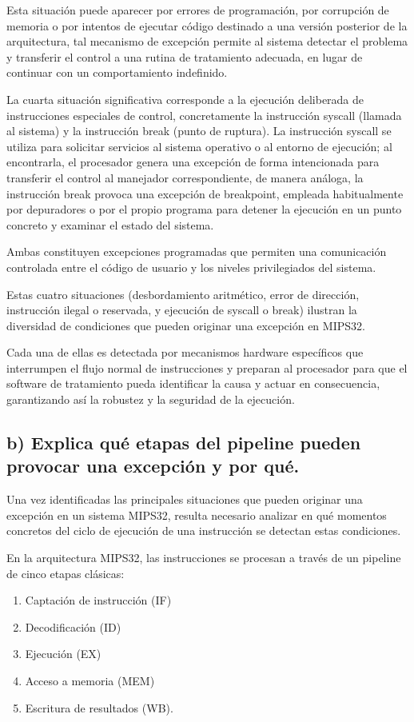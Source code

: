 \documentclass[12pt, letterpaper]{article}
\begin{document}
 Esta situación puede aparecer por errores de programación, por corrupción de memoria o por intentos de ejecutar código destinado a una versión posterior de la arquitectura, tal mecanismo de excepción permite al sistema detectar el problema y transferir el control a una rutina de tratamiento adecuada, en lugar de continuar con un comportamiento indefinido.

 La cuarta situación significativa corresponde a la ejecución deliberada de instrucciones especiales de control, concretamente la instrucción syscall (llamada al sistema) y la instrucción break (punto de ruptura). La instrucción syscall se utiliza para solicitar servicios al sistema operativo o al entorno de ejecución; al encontrarla, el procesador genera una excepción de forma intencionada para transferir el control al manejador correspondiente, de manera análoga, la instrucción break provoca una excepción de breakpoint, empleada habitualmente por depuradores o por el propio programa para detener la ejecución en un punto concreto y examinar el estado del sistema.

 Ambas constituyen excepciones programadas que permiten una comunicación controlada entre el código de usuario y los niveles privilegiados del sistema.

 Estas cuatro situaciones (desbordamiento aritmético, error de dirección, instrucción ilegal o reservada, y ejecución de syscall o break) ilustran la diversidad de condiciones que pueden originar una excepción en MIPS32. 

 Cada una de ellas es detectada por mecanismos hardware específicos que interrumpen el flujo normal de instrucciones y preparan al procesador para que el software de tratamiento pueda identificar la causa y actuar en consecuencia, garantizando así la robustez y la seguridad de la ejecución.
 \subsection*{b) Explica qué etapas del pipeline pueden provocar una excepción y por qué. }

 Una vez identificadas las principales situaciones que pueden originar una excepción en un sistema MIPS32, resulta necesario analizar en qué momentos concretos del ciclo de ejecución de una instrucción se detectan estas condiciones. 

 En la arquitectura MIPS32, las instrucciones se procesan a través de un pipeline de cinco etapas clásicas: 

\begin{enumerate}
    \item Captación de instrucción (IF)
    \item Decodificación (ID)
    \item Ejecución (EX)
    \item Acceso a memoria (MEM) 
    \item Escritura de resultados (WB). 
\end{enumerate}
 
\end{document}
